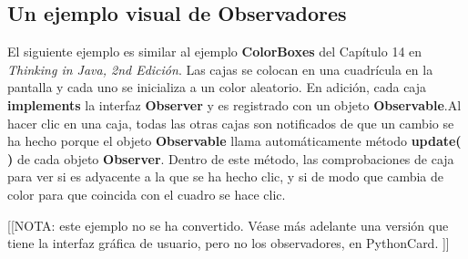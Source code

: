 \subsection*{Un ejemplo visual de Observadores}
\label{subsec:uevdo}

El siguiente ejemplo es similar al ejemplo \textbf{ColorBoxes}  del Capítulo 14 en \textit{Thinking in Java, 2nd Edición}. Las cajas se colocan en una cuadrícula en la pantalla y cada uno se inicializa a un color aleatorio. En adición, cada caja \textbf{implements} la interfaz \textbf{Observer} y es registrado con un objeto \textbf{Observable}.Al hacer clic en una caja, todas las otras cajas son notificados de que un cambio se ha hecho porque el objeto \textbf{Observable} llama automáticamente método \textbf{update( )} de cada objeto \textbf{Observer}.  Dentro de este método, las comprobaciones de caja para ver si es adyacente a la que se ha hecho clic, y si de modo que cambia de color para que coincida con el cuadro se hace clic.  \newline

[[NOTA: este ejemplo no se ha convertido. Véase más adelante una versión que tiene la interfaz gráfica de usuario, pero no los observadores, en PythonCard. ]]  \newline

